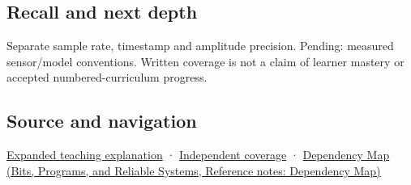 \subsection{Recall and next depth}\label{appendix-1077ea8fc737-recall-and-next-depth}

Separate sample rate, timestamp and amplitude precision. Pending: measured sensor/model conventions. Written coverage is not a claim of learner mastery or accepted numbered-curriculum progress.

\subsection{Source and navigation}\label{appendix-1077ea8fc737-source-and-navigation}

\hyperref[04-visual-computing-ii-ch042-sampling-is-a-question-of-what-remains-distinguishable]{Expanded teaching explanation} · \hyperref[appendix-fd090d982a15-xr01---independent-seeing-and-representation-source]{Independent coverage} · \href{../01-Bits-Programs-and-Reliable-Systems/main.pdf\#nameddest=appendix-4ad47bdd269a}{Dependency Map (Bits, Programs, and Reliable Systems, Reference notes: Dependency Map)}
